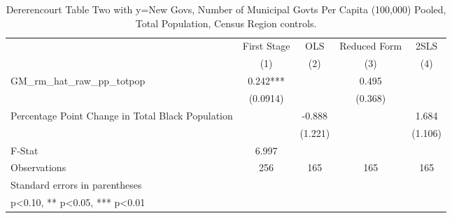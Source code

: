 \begin{table}[htbp]\centering
\def\sym#1{\ifmmode^{#1}\else\(^{#1}\)\fi}
\caption{Dererencourt Table Two with y=New Govs, Number of Municipal Govts Per Capita (100,000) Pooled, Total Population, Census Region controls.}
\begin{tabular}{l*{4}{c}}
\toprule
                    & First Stage   &         OLS   &Reduced Form   &        2SLS   \\
                    &\multicolumn{1}{c}{(1)}   &\multicolumn{1}{c}{(2)}   &\multicolumn{1}{c}{(3)}   &\multicolumn{1}{c}{(4)}   \\
\midrule
GM\_rm\_hat\_raw\_pp\_totpop&       0.242***&               &       0.495   &               \\
                    &    (0.0914)   &               &     (0.368)   &               \\
\addlinespace
Percentage Point Change in Total Black Population&               &      -0.888   &               &       1.684   \\
                    &               &     (1.221)   &               &     (1.106)   \\
\midrule
F-Stat              &       6.997   &               &               &               \\
Observations        &         256   &         165   &         165   &         165   \\
\bottomrule
\multicolumn{5}{l}{\footnotesize Standard errors in parentheses}\\
\multicolumn{5}{l}{\footnotesize * p<0.10, ** p<0.05, *** p<0.01}\\
\end{tabular}
\end{table}
